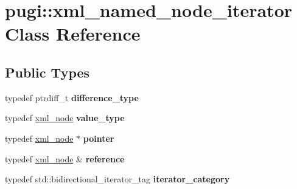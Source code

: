 \hypertarget{classpugi_1_1xml__named__node__iterator}{}\section{pugi\+:\+:xml\+\_\+named\+\_\+node\+\_\+iterator Class Reference}
\label{classpugi_1_1xml__named__node__iterator}
\subsection*{Public Types}
\begin{DoxyCompactItemize}
\item 
\mbox{\label{classpugi_1_1xml__named__node__iterator_a18fa0d610fea4d64271729abc0e28849}} 
typedef ptrdiff\+\_\+t {\bfseries difference\+\_\+type}
\item 
\mbox{\label{classpugi_1_1xml__named__node__iterator_a8d98d8218ea9740ceb990ef2c1a456e2}} 
typedef \hyperlink{classpugi_1_1xml__node}{xml\+\_\+node} {\bfseries value\+\_\+type}
\item 
\mbox{\label{classpugi_1_1xml__named__node__iterator_aebf72c68ded20cf483a10c6b94aa3f57}} 
typedef \hyperlink{classpugi_1_1xml__node}{xml\+\_\+node} $\ast$ {\bfseries pointer}
\item 
\mbox{\label{classpugi_1_1xml__named__node__iterator_a1c338c7a2aefe04b83f746a963df808b}} 
typedef \hyperlink{classpugi_1_1xml__node}{xml\+\_\+node} \& {\bfseries reference}
\item 
\mbox{\label{classpugi_1_1xml__named__node__iterator_ab7dad0df34f043a9458b2a6b309a227f}} 
typedef std\+::bidirectional\+\_\+iterator\+\_\+tag {\bfseries iterator\+\_\+category}
\end{DoxyCompactItemize}
